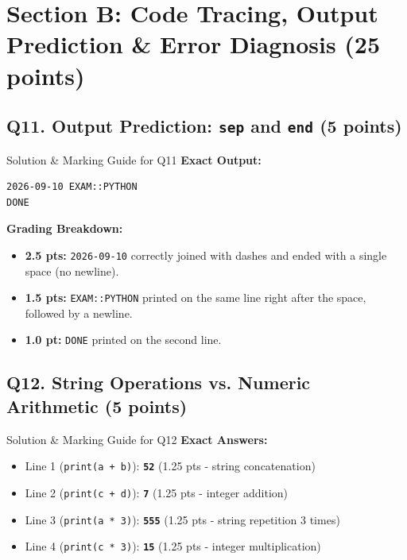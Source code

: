 \documentclass[11pt,a4paper]{article}
\begin{document}
\section*{Section B: Code Tracing, Output Prediction \& Error Diagnosis (25 points)}

\subsection*{Q11. Output Prediction: \texttt{sep} and \texttt{end} (5 points)}
\begin{solbox}{Solution \& Marking Guide for Q11}
\textbf{Exact Output:}
\begin{lstlisting}
2026-09-10 EXAM::PYTHON
DONE
\end{lstlisting}
\textbf{Grading Breakdown:}
\begin{itemize}[noitemsep]
  \item \textbf{2.5 pts:} \texttt{2026-09-10} correctly joined with dashes and ended with a single space (no newline).
  \item \textbf{1.5 pts:} \texttt{EXAM::PYTHON} printed on the same line right after the space, followed by a newline.
  \item \textbf{1.0 pt:} \texttt{DONE} printed on the second line.
\end{itemize}
\end{solbox}

\vspace{0.2cm}

\subsection*{Q12. String Operations vs. Numeric Arithmetic (5 points)}
\begin{solbox}{Solution \& Marking Guide for Q12}
\textbf{Exact Answers:}
\begin{itemize}[noitemsep]
  \item Line 1 (\texttt{print(a + b)}): \textbf{\texttt{52}} \hfill (1.25 pts - string concatenation)
  \item Line 2 (\texttt{print(c + d)}): \textbf{\texttt{7}} \hfill (1.25 pts - integer addition)
  \item Line 3 (\texttt{print(a * 3)}): \textbf{\texttt{555}} \hfill (1.25 pts - string repetition 3 times)
  \item Line 4 (\texttt{print(c * 3)}): \textbf{\texttt{15}} \hfill (1.25 pts - integer multiplication)
\end{itemize}
\end{solbox}
\end{document}
